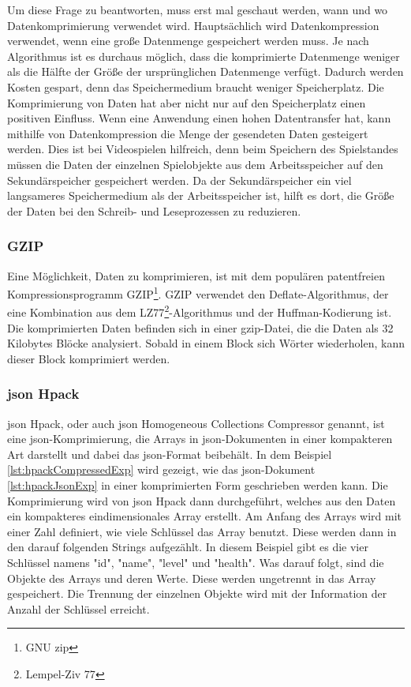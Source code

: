 Um diese Frage zu beantworten, muss erst mal geschaut werden, wann und wo Datenkomprimierung verwendet wird. Hauptsächlich wird Datenkompression verwendet, wenn eine große Datenmenge gespeichert werden muss. Je nach Algorithmus ist es durchaus möglich, dass die komprimierte Datenmenge weniger als die Hälfte der Größe der ursprünglichen Datenmenge verfügt. Dadurch werden Kosten gespart, denn das Speichermedium braucht weniger Speicherplatz. Die Komprimierung von Daten hat aber nicht nur auf den Speicherplatz einen positiven Einfluss. Wenn eine Anwendung einen hohen Datentransfer hat, kann mithilfe von Datenkompression die Menge der gesendeten Daten gesteigert werden. Dies ist bei Videospielen hilfreich, denn beim Speichern des Spielstandes müssen die Daten der einzelnen Spielobjekte aus dem Arbeitsspeicher auf den Sekundärspeicher gespeichert werden. Da der Sekundärspeicher ein viel langsameres Speichermedium als der Arbeitsspeicher ist, hilft es dort, die Größe der Daten bei den Schreib- und Leseprozessen zu reduzieren.\cite{mediumWhenDataCompression}

\subsubsection{GZIP}

Eine Möglichkeit, Daten zu komprimieren, ist mit dem populären patentfreien Kompressionsprogramm GZIP\footnote{GNU zip}. GZIP verwendet den Deflate-Algorithmus, der eine Kombination aus dem  LZ77\footnote{Lempel-Ziv 77}-Algorithmus und der Huffman-Kodierung ist. Die komprimierten Daten befinden sich in einer gzip-Datei, die die Daten als 32 Kilobytes Blöcke analysiert. Sobald in einem Block sich Wörter wiederholen, kann dieser Block komprimiert werden. \cite{gnuGzip}\cite{1414952}\cite{seobilityGzipFunktioniert}

\subsubsection{\ac{json} Hpack}
\ac{json} Hpack, oder auch \ac{json} Homogeneous Collections Compressor genannt, ist eine \ac{json}-Komprimierung, die Arrays in \ac{json}-Dokumenten in einer kompakteren Art darstellt und dabei das \ac{json}-Format beibehält. In dem Beispiel \ref{lst:hpackCompressedExp} wird gezeigt, wie das \ac{json}-Dokument \ref{lst:hpackJsonExp} in einer komprimierten Form geschrieben werden kann. Die Komprimierung wird von \ac{json} Hpack dann durchgeführt, welches aus den Daten ein kompakteres eindimensionales Array erstellt. Am Anfang des Arrays wird mit einer Zahl definiert, wie viele Schlüssel das Array benutzt. Diese werden dann in den darauf folgenden Strings aufgezählt. In diesem Beispiel gibt es die vier Schlüssel namens "id", "name", "level" und "health". Was darauf folgt, sind die Objekte des Arrays und deren Werte. Diese werden ungetrennt in das Array gespeichert. Die Trennung der einzelnen Objekte wird mit der Information der Anzahl der Schlüssel erreicht.
\cite{webreflectionLastVersion}


